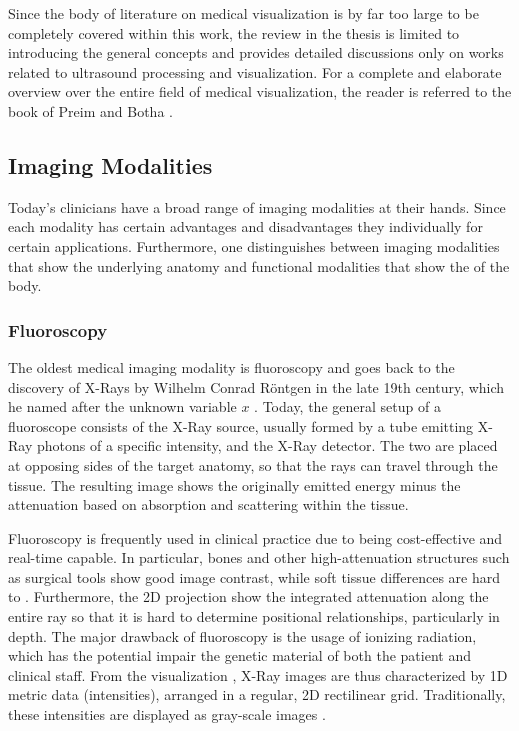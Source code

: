 Since the body of literature on medical visualization is by far too large to be completely covered within this work, the review in the thesis is limited to introducing the general concepts and provides detailed discussions only on works related to ultrasound processing and visualization.
For a complete and elaborate overview over the entire field of medical visualization, the reader is referred to the book of Preim and Botha \cite{Preim:2013:VisualComputingForMedicine}.


\subsection{Imaging Modalities}
\label{sec:background:imaging-modalities}

Today's clinicians have a broad range of imaging modalities at their hands.
Since each modality has certain advantages and disadvantages they individually  for certain applications.
Furthermore, one distinguishes between imaging modalities that show the underlying anatomy and functional modalities that show the  of the body.

\subsubsection{Fluoroscopy}
The oldest medical imaging modality is fluoroscopy and goes back to the discovery of X-Rays by Wilhelm Conrad Röntgen in the late 19th century, which he named after the unknown variable $x$ \cite{Roentgen:1898:NeueArtStrahlen}.
Today, the general setup of a fluoroscope consists of the X-Ray source, usually formed by a tube emitting X-Ray photons of a specific intensity, and the X-Ray detector.
The two are placed at opposing sides of the target anatomy, so that the rays can travel through the tissue.
The resulting image shows the originally emitted energy minus the attenuation based on absorption and scattering within the tissue.

Fluoroscopy is frequently used in clinical practice due to being cost-effective and real-time capable.
In particular, bones and other high-attenuation structures such as surgical tools show good image contrast, while soft tissue differences are hard to .
Furthermore, the 2D projection show the integrated attenuation along the entire ray so that it is hard to determine positional relationships, particularly in depth.
The major drawback of fluoroscopy is the usage of ionizing radiation, which has the potential impair the genetic material of both the patient and clinical staff.
From the visualization , X-Ray images are thus characterized by 1D metric data (intensities), arranged in a regular, 2D rectilinear grid.
Traditionally, these intensities are displayed as gray-scale images \II.



